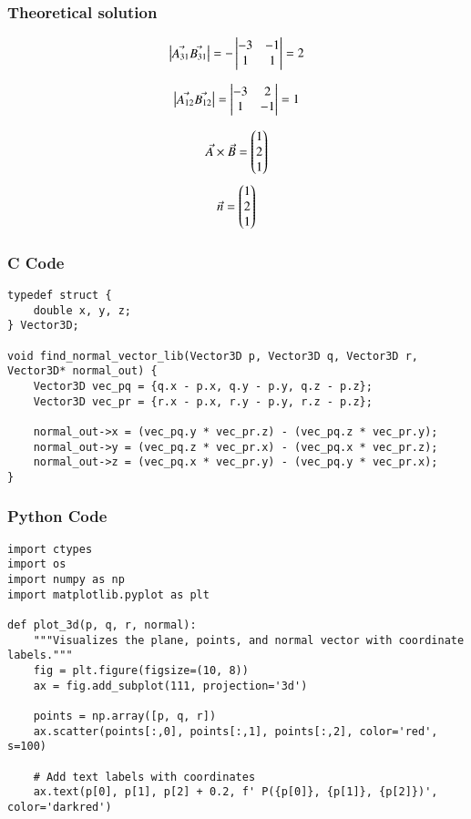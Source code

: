 \documentclass{beamer}
\begin{document}
     \begin{frame}
    \frametitle{Theoretical solution}

    \begin{align}
 \begin{vmatrix}\Vec{A_{31}} \Vec{B_{31}}\end{vmatrix}=-\begin{vmatrix}-3&-1\\1&1\end{vmatrix}=2
\end{align}

\begin{align}
 \begin{vmatrix}\Vec{A_{12}} \Vec{B_{12}}\end{vmatrix}=\begin{vmatrix}-3&2\\1&-1\end{vmatrix}=1
\end{align}

\begin{align}
  \Vec{A}\times\Vec{B}=\begin{pmatrix}1\\2\\1\end{pmatrix}
\end{align}
\begin{align}
   \Vec{n}=\begin{pmatrix}1\\2\\1\end{pmatrix}
\end{align}

    \end{frame}

    
    
    
   
    \begin{frame}[fragile]
        \frametitle{C Code}
        \begin{lstlisting}
typedef struct {
    double x, y, z;
} Vector3D;

void find_normal_vector_lib(Vector3D p, Vector3D q, Vector3D r, Vector3D* normal_out) {
    Vector3D vec_pq = {q.x - p.x, q.y - p.y, q.z - p.z};
    Vector3D vec_pr = {r.x - p.x, r.y - p.y, r.z - p.z};
    
    normal_out->x = (vec_pq.y * vec_pr.z) - (vec_pq.z * vec_pr.y);
    normal_out->y = (vec_pq.z * vec_pr.x) - (vec_pq.x * vec_pr.z);
    normal_out->z = (vec_pq.x * vec_pr.y) - (vec_pq.y * vec_pr.x);
}
        \end{lstlisting}
    \end{frame}
    
   
    
    \begin{frame}[fragile]
        \frametitle{Python Code}
        \begin{lstlisting}
import ctypes
import os
import numpy as np
import matplotlib.pyplot as plt

def plot_3d(p, q, r, normal):
    """Visualizes the plane, points, and normal vector with coordinate labels."""
    fig = plt.figure(figsize=(10, 8))
    ax = fig.add_subplot(111, projection='3d')

    points = np.array([p, q, r])
    ax.scatter(points[:,0], points[:,1], points[:,2], color='red', s=100)

    # Add text labels with coordinates
    ax.text(p[0], p[1], p[2] + 0.2, f' P({p[0]}, {p[1]}, {p[2]})', color='darkred')
  

        \end{lstlisting}
    \end{frame}
    
\end{document}
